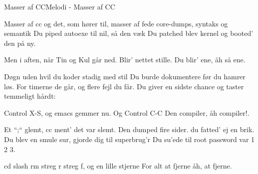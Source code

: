 \begin{sang}{Masser af CC}{Melodi - Masser af CC}
\begin{vers}
Masser af cc
og det, som hører til,
masser af fede core-dumps,
syntaks og semantik
Du piped autoexe
til nil, så den væk
Du patched blev kernel
og booted' den på ny.
\end{vers}
\begin{vers}
Men i aften, når Tin og Kul går ned.
Blir' nettet stille.
Du blir' ene, åh så ene.
\end{vers}
\begin{vers}
Døgn uden hvil
du koder stadig med stil
Du burde dokumentere
før du hamrer løs.
For timerne de går,
og flere fejl du får.
Du giver en sidste chance
og taster temmeligt hårdt:
\end{vers}

\begin{vers}
Control X-S, og emacs gemmer nu.
Og Control C-C
Den compiler, åh compiler!.
\end{vers}
\begin{vers}
Et “;“ glemt,
cc ment' det var slemt.
Den dumped fire sider.
du fatted' ej en brik.
Du blev en smule sur,
gjorde dig til superbrug'r
Du su'ede til root
password var 1 2 3.
\end{vers}
\begin{vers}
cd slash rm streg r streg f,
og en lille stjerne
For alt at fjerne
åh, at fjerne. 
\end{vers}
\vbox{}\vfill
\vbox{}\vfill
\vbox{}\vfill
\laps
\end{sang}